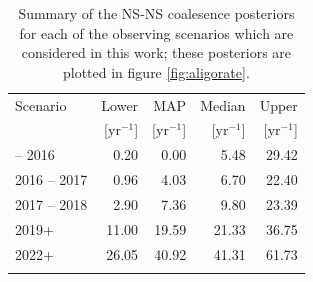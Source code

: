 \documentclass[twocolumn,nofootinbib]{revtex4-1}
\newcommand{\yr}{\mathrm{yr}}
\begin{document}
\begin{table}
\begin{center}
  \begin{tabular}{lrrrr}
    \toprule
    Scenario & Lower       & MAP             & Median          & Upper\\
             & [$\yr^{-1}$] & [$\yr^{-1}$]    & [$\yr^{-1}$]    & [$\yr^{-1}$]  \\
    \colrule
    2015 -- 2016 & 0.20 & 0.00 & 5.48 & 29.42\\
    2016 -- 2017 & 0.96 & 4.03 & 6.70 & 22.40\\
    2017 -- 2018 & 2.90 & 7.36 & 9.80 & 23.39\\
    2019+ & 11.00 & 19.59 & 21.33 & 36.75\\
    2022+ & 26.05 & 40.92 & 41.31 & 61.73\\
    \botrule
\end{tabular}
\end{center}

\caption{Summary of the NS-NS coalesence posteriors for each of the observing
  scenarios which are considered in this work; these posteriors are plotted
  in figure \ref{fig:aligorate}.
  \label{tab:rateposteriors}
}
\end{table}
\end{document}
